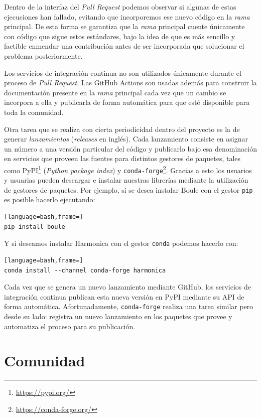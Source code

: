 Dentro de la interfaz del \emph{Pull Request} podemos observar si algunas de
estas ejecuciones han fallado, evitando que incorporemos ese nuevo código en la
\emph{rama} principal.
De esta forma se garantiza que la \emph{rama} principal cuente únicamente con
código que sigue estos estándares, bajo la idea de que es más sencillo
y factible enmendar una contribución antes de ser incorporada que solucionar el
problema posteriormente.

Los servicios de integración continua no son utilizados únicamente durante el
proceso de \emph{Pull Request}.
Las GitHub Actions son usadas además para construir la documentación presente
en la \emph{rama} principal cada vez que un cambio se incorpora a ella
y publicarla de forma automática para que esté disponible para toda la
comunidad.

Otra tarea que se realiza con cierta periodicidad dentro del proyecto es la de
generar \emph{lanzamientos} (\emph{releases} en inglés).
Cada lanzamiento consiste en asignar un número a una versión particular del
código y publicarlo bajo esa denominación en servicios que proveen las fuentes
para distintos gestores de paquetes, tales como
PyPI\footnote{\url{https://pypi.org/}} (\emph{Python package index})
y \texttt{conda-forge}\footnote{\url{https://conda-forge.org/}}.
Gracias a esto los usuarios y usuarias pueden descargar e instalar nuestras
librerías mediante la utilización de gestores de paquetes.
Por ejemplo, si se desea instalar Boule con el gestor \texttt{pip} es posible
hacerlo ejecutando:

\begin{lstlisting}[language=bash,frame=]
pip install boule
\end{lstlisting}
%
Y si deseamos instalar Harmonica con el gestor \texttt{conda} podemos
hacerlo con:

\begin{lstlisting}[language=bash,frame=]
conda install --channel conda-forge harmonica
\end{lstlisting}

Cada vez que se genera un nuevo lanzamiento mediante GitHub,
los servicios de integración continua publican esta nueva versión en PyPI
mediante su \ac{API} de forma automática.
Afortunadamente, \texttt{conda-forge} realiza una tarea similar pero desde su
lado: registra un nuevo lanzamiento en los paquetes que provee y automatiza el
proceso para su publicación.


\section{Comunidad}
\label{sec:fatiando-community}

